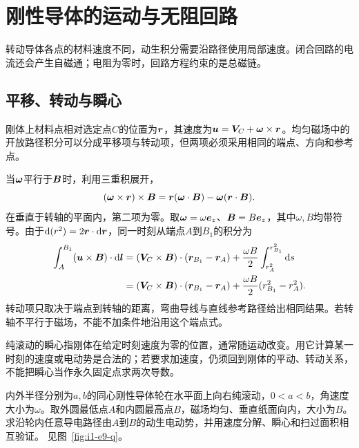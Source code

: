 \section{刚性导体的运动与无阻回路}\label{sec:i1-motional}
转动导体各点的材料速度不同，动生积分需要沿路径使用局部速度。闭合回路的电流还会产生自磁通；电阻为零时，回路方程约束的是总磁链。

\subsection{平移、转动与瞬心}
刚体上材料点相对选定点$C$的位置为$\bm{r}$，其速度为$\bm{u}=\bm{V}_C+\bm{\omega}\times\bm{r}$。均匀磁场中的开放路径积分可以分成平移项与转动项，但两项必须采用相同的端点、方向和参考点。

当$\bm{\omega}$平行于$\bm{B}$时，利用三重积展开，
\[(\bm{\omega}\times\bm{r})\times\bm{B}
=\bm{r}(\bm{\omega}\cdot\bm{B})-\bm{\omega}(\bm{r}\cdot\bm{B}).
\]
在垂直于转轴的平面内，第二项为零。取$\bm{\omega}=\omega\bm{e}_z$、$\bm{B}=B\bm{e}_z$，其中$\omega,B$均带符号。由于$\mathop{}\!\mathrm d(r^2)=2\bm{r}\cdot\mathop{}\!\mathrm d\bm{r}$，同一时刻从端点$A$到$B_1$的积分为
\[\begin{aligned}
\int_A^{B_1}(\bm{u}\times\bm{B})\cdot\mathop{}\!\mathrm d\bm{l}
&=(\bm{V}_C\times\bm{B})\cdot(\bm{r}_{B_1}-\bm{r}_A)
+\frac{\omega B}{2}\int_{r_A^2}^{r_{B_1}^2}\mathop{}\!\mathrm d s\\
&=(\bm{V}_C\times\bm{B})\cdot(\bm{r}_{B_1}-\bm{r}_A)
+\frac{\omega B}{2}(r_{B_1}^2-r_A^2).
\end{aligned}\]
转动项只取决于端点到转轴的距离，弯曲导线与直线参考路径给出相同结果。若转轴不平行于磁场，不能不加条件地沿用这个端点式。

纯滚动的瞬心指刚体在给定时刻速度为零的位置，通常随运动改变。用它计算某一时刻的速度或电动势是合法的；若要求加速度，仍须回到刚体的平动、转动关系，不能把瞬心当作永久固定点求两次导数。


\begin{example}[双半径滚轮的三种算法]\label{ex:i1-e9}
内外半径分别为$a,b$的同心刚性导体轮在水平面上向右纯滚动，$0<a<b$，角速度大小为$\omega$。取外圆最低点$A$和内圆最高点$B$，磁场均匀、垂直纸面向内，大小为$B$。求沿轮内任意导电路径由$A$到$B$的动生电动势，并用速度分解、瞬心和扫过面积相互验证。 见图~\ref{fig:i1-e9-q}。
\end{example}

